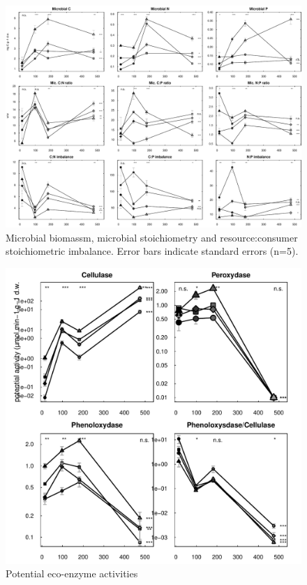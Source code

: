 \documentclass[10pt]{article}
\begin{document}
\newpage
\begin{figure}[h!s]
\vspace*{2mm}
\begin{center}
\includegraphics{plosone-mb}
\end{center}
\caption{Microbial biomassm, microbial stoichiometry and resource:consumer stoichiometric imbalance. Error bars indicate standard errors (n=5).}
\label{fig:mb}
\end{figure}






\newpage
\begin{figure}[h!]
\vspace*{2mm}
\begin{center}
\includegraphics{plosone-enz}
\end{center}
\caption{Potential eco-enzyme activities}
\label{fig:enz}
\end{figure}
\end{document}
